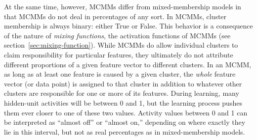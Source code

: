 At the same time, however, MCMMs differ from mixed-membership models in that MCMMs do not deal in 
percentages of any sort.
In MCMMs, 
cluster membership is always binary: either True or False. %
This behavior is a consequence of the nature of \emph{mixing functions}, the activation functions of MCMMs (see section~\ref{sec:mixing-function}). 
While MCMMs do allow individual clusters to claim responsibility 
for particular features, they ultimately do not attribute different proportions of a given feature vector
to different clusters. In an MCMM, as long as at least one feature is caused by a given cluster, the \emph{whole} feature
vector (or data point) is assigned to that cluster in addition to whatever other clusters are responsible for one or more of its features. 
During learning, many hidden-unit activities will be between 0 and 1,
but the learning process pushes them ever closer to one of these two values. 
Activity values between 0 and 1 can be interpreted as ``almost off'' or ``almost on,'' depending on where exactly they lie in this interval,
but not as real percentages as in mixed-membership models. 

